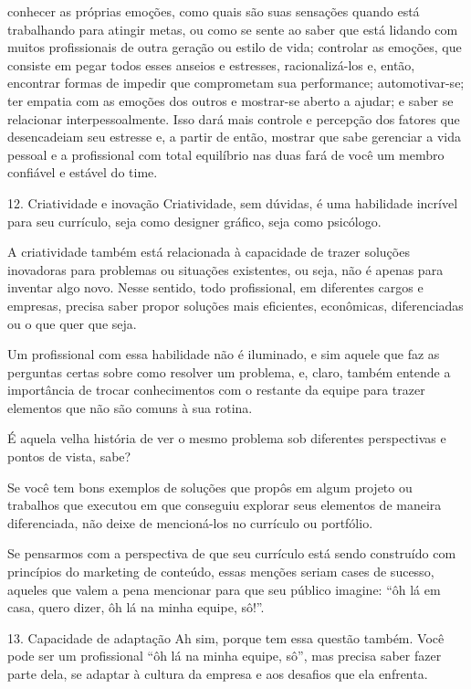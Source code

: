 \begin{commentA}
conhecer as próprias emoções, como quais são suas sensações quando está trabalhando para atingir metas, ou como se sente ao saber que está lidando com muitos profissionais de outra geração ou estilo de vida;
controlar as emoções, que consiste em pegar todos esses anseios e estresses, racionalizá-los e, então, encontrar formas de impedir que comprometam sua performance;
automotivar-se;
ter empatia com as emoções dos outros e mostrar-se aberto a ajudar; e
saber se relacionar interpessoalmente.
Isso dará mais controle e percepção dos fatores que desencadeiam seu estresse e, a partir de então, mostrar que sabe gerenciar a vida pessoal e a profissional com total equilíbrio nas duas fará de você um membro confiável e estável do time.

12. Criatividade e inovação
Criatividade, sem dúvidas, é uma habilidade incrível para seu currículo, seja como designer gráfico, seja como psicólogo.

A criatividade também está relacionada à capacidade de trazer soluções inovadoras para problemas ou situações existentes, ou seja, não é apenas para inventar algo novo. Nesse sentido, todo profissional, em diferentes cargos e empresas, precisa saber propor soluções mais eficientes, econômicas, diferenciadas ou o que quer que seja.

Um profissional com essa habilidade não é iluminado, e sim aquele que faz as perguntas certas sobre como resolver um problema, e, claro, também entende a importância de trocar conhecimentos com o restante da equipe para trazer elementos que não são comuns à sua rotina.

É aquela velha história de ver o mesmo problema sob diferentes perspectivas e pontos de vista, sabe?

Se você tem bons exemplos de soluções que propôs em algum projeto ou trabalhos que executou em que conseguiu explorar seus elementos de maneira diferenciada, não deixe de mencioná-los no currículo ou portfólio.

Se pensarmos com a perspectiva de que seu currículo está sendo construído com princípios do marketing de conteúdo, essas menções seriam cases de sucesso, aqueles que valem a pena mencionar para que seu público imagine: “ôh lá em casa, quero dizer, ôh lá na minha equipe, sô!”.

13. Capacidade de adaptação
Ah sim, porque tem essa questão também. Você pode ser um profissional “ôh lá na minha equipe, sô”, mas precisa saber fazer parte dela, se adaptar à cultura da empresa e aos desafios que ela enfrenta.


\end{commentA}
